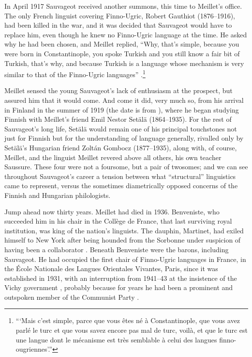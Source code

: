 \documentclass[output=paper]{langscibook}
\begin{document}
In April 1917 Sauvageot received another summons, this time to Meillet's office. The only French linguist covering Finno-Ugric, Robert Gauthiot (1876--1916), had been killed in the war, and it was decided that Sauvageot would have to replace him, even though he knew no Finno-Ugric language at the time. He asked why he had been chosen, and Meillet replied, ``Why, that's simple, because you were born in Constantinople, you spoke Turkish and you still know a fair bit of Turkish, that's why, and because Turkish is a language whose mechanism is very similar to that of the Finno-Ugric languages'' \citep[194]{Sauvageot1992}.\footnote{```Mais c'est simple, parce que vous êtes né à Constantinople, que vous avez parlé le turc et que vous savez encore pas mal de turc, voilà, et que le turc est une langue dont le mécanisme est très semblable à celui des langues finno-ougriennes'.''}

Meillet sensed the young Sauvageot's lack of enthusiasm at the prospect, but assured him that it would come. And come it did, very much so, from his arrival in Finland in the summer of 1919 (the date is from \citet[296]{Perrot2007}), where he began studying Finnish with Meillet's friend Emil Nestor Setälä (1864--1935). For the rest of Sauvageot's long life, Setälä would remain one of his principal touchstones not just for Finnish but for the understanding of language generally, rivalled only by Setälä's Hungarian friend Zoltán Gombocz (1877--1935), along with, of course, Meillet, and the linguist Meillet revered above all others, his own teacher Saussure. These four were not a foursome, but a pair of twosomes; and we can see throughout Sauvageot's career a tension between what ``structural'' linguistics came to represent, versus the sometimes diametrically opposed concerns of the Finnish and Hungarian philologists.

Jump ahead now thirty years. Meillet had died in 1936. Benveniste, who succeeded him in his chair in the Collège de France, that last surviving royal institution, was king of the nation's linguists. The dauphin, Martinet, had exiled himself to New York after being hounded from the Sorbonne under suspicion of having been a collaborator \citep[see][]{Joseph2016}. Beneath Benveniste were the barons, including Sauvageot. He had occupied the first chair of Finno-Ugric languages in France, in the École Nationale des Langues Orientales Vivantes, Paris, since it was established in 1931, with an interruption from 1941--43 at the insistence of the Vichy government \citep[296]{Perrot2007}, probably because for years he had been a prominent and outspoken member of the Communist Party \citep[see][158]{Chevalier2006}.
\end{document}

